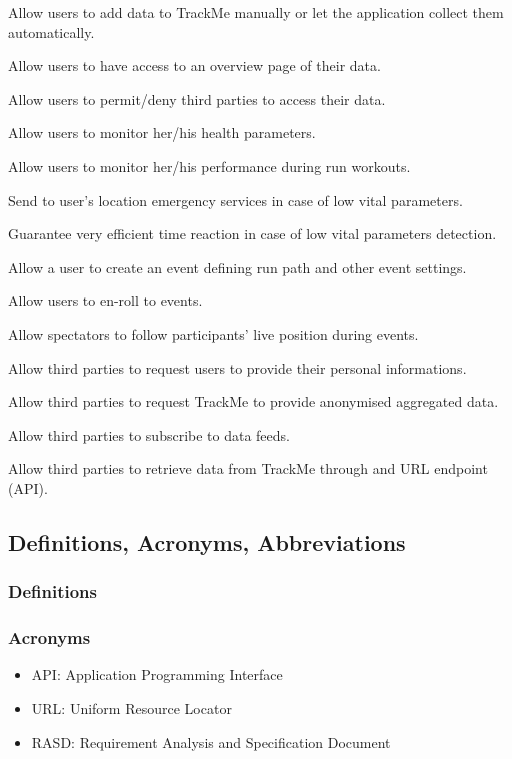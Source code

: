 \documentclass{article}
\begin{document}
\begin{enumerate}[label={[G\arabic*]}]
\item Allow users to add data to TrackMe manually or let the application collect them automatically.
\item Allow users to have access to an overview page of their data.
\item Allow users to permit/deny third parties to access their data.
\item Allow users to monitor her/his health parameters.
\item Allow users to monitor her/his performance during run workouts.
\item Send to user’s location emergency services in case of low vital parameters. 
\item Guarantee very efficient time reaction in case of low vital parameters detection.
\item Allow a user to create an event defining run path and other event settings.
\item Allow users to en-roll to events.
\item Allow spectators to follow participants’ live position during events.


\item Allow third parties to request users to provide their personal informations.
\item Allow third parties to request TrackMe to provide anonymised aggregated data.
\item Allow third parties to subscribe to data feeds.
\item Allow third parties to retrieve data from TrackMe through and URL endpoint (API). 
\end{enumerate}


\subsection{Definitions, Acronyms, Abbreviations}
\subsubsection{Definitions}
\subsubsection{Acronyms}
\begin{itemize}
\item API: Application Programming Interface
\item URL: Uniform Resource Locator
\item RASD:  Requirement Analysis and Specification Document 
\end{itemize}
\end{document}
